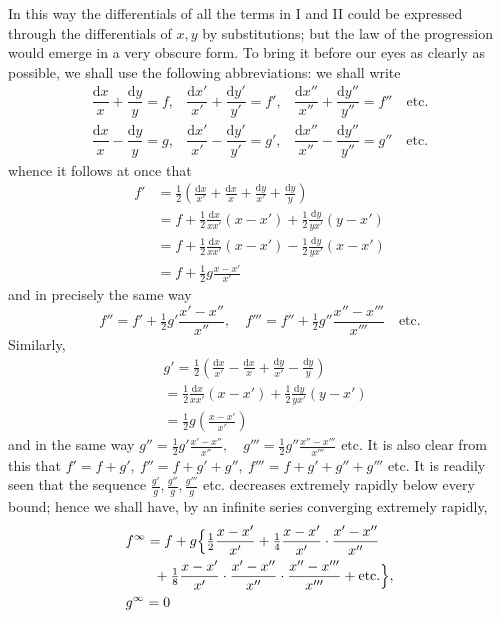 In this way the differentials of all the terms in I and II could be expressed through the differentials of
$x,y$ by substitutions; but the law of the progression would emerge in a very
obscure form. To bring it before our eyes as clearly as possible, we shall use the following
abbreviations: we shall write
\[
\begin{array}{lll}
\dfrac{\mathrm{d}x}{x}+\dfrac{\mathrm{d}y}{y}=f,&
\dfrac{\mathrm{d}x'}{x'}+\dfrac{\mathrm{d}y'}{y'}=f',&
\dfrac{\mathrm{d}x''}{x''}+\dfrac{\mathrm{d}y''}{y''}=f''\quad\mathrm{etc.}\\[7pt]
\dfrac{\mathrm{d}x}{x}-\dfrac{\mathrm{d}y}{y}=g,&
\dfrac{\mathrm{d}x'}{x'}-\dfrac{\mathrm{d}y'}{y'}=g',&
\dfrac{\mathrm{d}x''}{x''}-\dfrac{\mathrm{d}y''}{y''}=g''\quad\mathrm{etc.}
\end{array}
\]
whence it follows at once that
\[
\begin{aligned}
f'&=\tfrac12\left(\frac{\mathrm{d}x}{x'}+\frac{\mathrm{d}x}{x}+\frac{\mathrm{d}y}{x'}+\frac{\mathrm{d}y}{y}\right)\\&=f+\tfrac12\frac{\mathrm{d}x}{xx'}(x-x')+\tfrac12\frac{\mathrm{d}y}{yx'}(y-x')\\[7pt]
&=f+\tfrac12\frac{\mathrm{d}x}{xx'}(x-x')-\tfrac12\frac{\mathrm{d}y}{yx'}(x-x')\\&=f+\tfrac12 g\frac{x-x'}{x'}
\end{aligned}
\]
and in precisely the same way
\[
f''=f'+\tfrac12 g'\frac{x'-x''}{x''},\quad
f'''=f''+\tfrac12 g''\frac{x''-x'''}{x'''}\quad\mathrm{etc.}
\]
Similarly,
\[
\begin{aligned}&g'=\tfrac12\left(\frac{\mathrm{d}x}{x'}-\frac{\mathrm{d}x}{x}+\frac{\mathrm{d}y}{x'}-\frac{\mathrm{d}y}{y}\right)\\&=\tfrac12\frac{\mathrm{d}x}{xx'}(x-x')+\tfrac12\frac{\mathrm{d}y}{yx'}(y-x')\\&=\tfrac12 g\left(\frac{x-x'}{x'}\right)\end{aligned}
\]
and in the same way \(g''=\tfrac12 g'\frac{x'-x''}{x''},\quad
g'''=\tfrac12 g''\frac{x''-x'''}{x'''}\) etc.
It is also clear from this that
\(f'=f+g',\ f''=f+g'+g'',\ f'''=f+g'+g''+g'''\) etc.
It is readily seen that the sequence
\(\frac{g'}{g},\frac{g''}{g},\frac{g'''}{g}\) etc.
decreases extremely rapidly below every bound; hence we shall have, by an infinite series converging extremely rapidly,
\[
\begin{aligned}&f^\infty=f+g\Bigl\{\tfrac12\frac{x-x'}{x'}
+\tfrac14\frac{x-x'}{x'}\cdot\frac{x'-x''}{x''}\\&\qquad+\tfrac18\frac{x-x'}{x'}\cdot\frac{x'-x''}{x''}\cdot\frac{x''-x'''}{x'''}
+\mathrm{etc.}\Bigr\},\\&g^\infty=0\end{aligned}
\]

